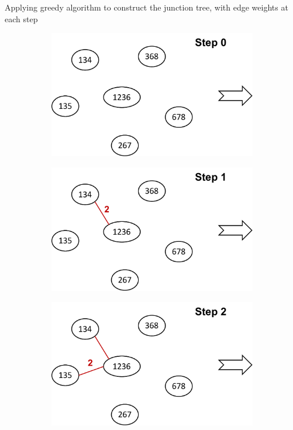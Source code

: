 \documentclass{article}
\begin{document}
Applying greedy algorithm to construct the junction tree, with edge weights at each step
\begin{figure}[h]
  \centering
  \begin{subfigure}[b]{0.315\textwidth}
  	\centering
  	\includegraphics[width=\columnwidth]{3b1.pdf}
  \end{subfigure}
  \hspace{0.1cm}
  \begin{subfigure}[b]{0.315\textwidth}
    \centering
  	\includegraphics[width=\columnwidth]{3b2.pdf}
  \end{subfigure}
  \hspace{0.1cm}
  \begin{subfigure}[b]{0.315\textwidth}
    \centering
  	\includegraphics[width=\columnwidth]{3b3.pdf}

\end{subfigure}
\end{figure}
\end{document}
